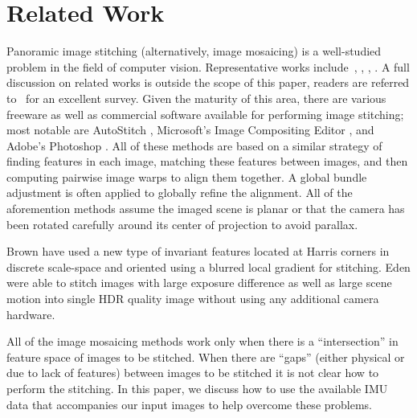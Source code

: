 \documentclass[10pt,twocolumn,letterpaper]{article}
\begin{document}
\section{Related Work}

Panoramic image stitching (alternatively, image mosaicing) is a
well-studied problem in the field of computer vision.  Representative
works include~\cite{Milgram1975}, \cite{Milgram1977}, \cite{Capel},
\cite{Szeliski1997} \cite{Brown07} \cite{Brown03}.  A full discussion
on related works is outside the scope of this paper, readers are
referred to~\cite{Szeliski05imagealignment} for an excellent survey.
Given the maturity of this area, there are various freeware as well as
commercial software available for performing image stitching; most
notable are AutoStitch \cite{autostitch} , Microsoft’s Image
Compositing Editor \cite{ICE}, and Adobe’s Photoshop \cite{photoshop}.
All of these methods are based on a similar strategy of finding
features in each image, matching these features between images, and
then computing pairwise image warps to align them together.  A global
bundle adjustment is often applied to globally refine the alignment.
All of the aforemention methods assume the imaged scene is planar or
that the camera has been rotated carefully around its center of
projection to avoid parallax.


Brown \etal \cite{Brown05} have used a new type of invariant features
located at Harris corners in discrete scale-space and oriented using a
blurred local gradient for stitching. Eden \etal \cite{Eden} were
able to stitch images with large exposure difference as well as large
scene motion into single HDR quality image without using any
additional camera hardware.

All of the image mosaicing methods work only when there is a
``intersection'' in feature space of images to be stitched. When there
are ``gaps'' (either physical or due to lack of features) between
images to be stitched it is not clear how to perform the stitching. In
this paper, we discuss how to use the available IMU data that
accompanies our input images to help overcome these problems.
\end{document}
